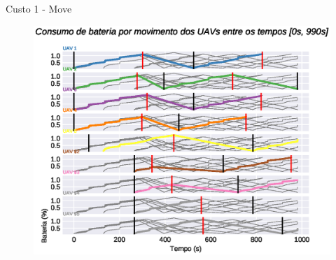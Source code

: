 \begin{frame}{Custo 1 - Move}
            \begin{figure}[!htb]
                    \includegraphics[width=\textwidth]{custo_1/uav_move_acum_all.eps}
                \end{figure}
        \end{frame}